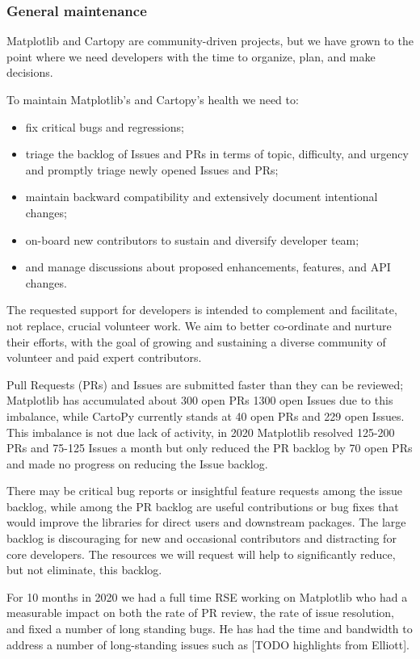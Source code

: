 \documentclass[12pt]{article}
\numberwithin{page}{section}
\begin{document}
\subsubsection{General maintenance}

Matplotlib and Cartopy are community-driven projects, but we have
grown to the point where we need developers with the time to organize,
plan, and make decisions.

To maintain Matplotlib's and Cartopy's health we need to:
\begin{itemize}[noitemsep]
\item fix critical bugs and regressions;
\item triage the backlog of Issues and PRs in terms of topic,
  difficulty, and urgency and promptly triage newly opened Issues and
  PRs;
\item maintain backward compatibility and extensively document
  intentional changes;
\item on-board new contributors to sustain and diversify developer
  team;
\item and manage discussions about proposed enhancements, features,
  and API changes.
\end{itemize}
The requested support for developers is intended to complement and
facilitate, not replace, crucial volunteer work.  We aim to better
co-ordinate and nurture their efforts, with the goal of growing and
sustaining a diverse community of volunteer and paid expert
contributors.


Pull Requests (PRs) and Issues are submitted faster than they can be
reviewed; Matplotlib has accumulated about 300 open PRs 1300 open
Issues due to this imbalance, while CartoPy currently stands at 40
open PRs and 229 open Issues.  This imbalance is not due lack of
activity, in 2020 Matplotlib resolved 125-200 PRs and 75-125 Issues a
month but only reduced the PR backlog by 70 open PRs and made no
progress on reducing the Issue backlog.

There may be critical bug reports or insightful feature requests among
the issue backlog, while among the PR backlog are useful contributions
or bug fixes that would improve the libraries for direct users and
downstream packages.  The large backlog is discouraging for new and
occasional contributors and distracting for core developers.  The
resources we will request will help to significantly reduce, but not
eliminate, this backlog.


For 10 months in 2020 we had a full time RSE working on Matplotlib who
had a measurable impact on both the rate of PR review, the rate of
issue resolution, and fixed a number of long standing bugs.  He has
had the time and bandwidth to address a number of long-standing issues
such as [TODO highlights from Elliott].
\end{document}
